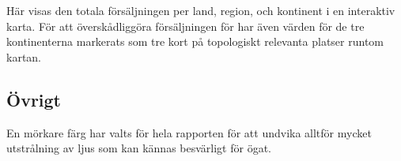 \documentclass[10pt]{article}
\begin{document}
Här visas den totala försäljningen per land, region, och kontinent i en interaktiv karta. För att överskådliggöra försäljningen för har även värden för de tre kontinenterna markerats som tre kort på topologiskt relevanta platser runtom kartan.

\subsection{Övrigt}

En mörkare färg har valts för hela rapporten för att undvika alltför mycket utstrålning av ljus som kan kännas besvärligt för ögat.\\\\\\\\\\\\\\
\end{document}
